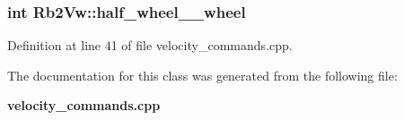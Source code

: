 \subsubsection[{half\-\_\-wheel\-\_\-2\-\_\-wheel}]{\setlength{\rightskip}{0pt plus 5cm}int {\bf \-Rb2\-Vw\-::half\-\_\-wheel\-\_\-\_\-wheel}}\label{classRb2Vw_ab9617a0f5d51473c118277312e863c33}


\-Definition at line 41 of file velocity\-\_\-commands.\-cpp.



\-The documentation for this class was generated from the following file\-:\begin{DoxyCompactItemize}
\item 
{\bf velocity\-\_\-commands.\-cpp}\end{DoxyCompactItemize}
